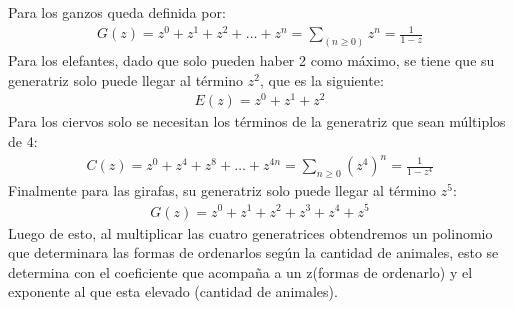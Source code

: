 \documentclass[spanish, fleqn]{article}
\begin{document}
    Para los ganzos queda definida por:
    \begin{align*}
    G(z)=z^0+z^1+z^2+\dots+z^n=\sum_(n \geqslant 0) z^n =\frac{1}{1-z}
    \end{align*}
    Para los elefantes, dado que solo pueden haber 2 como máximo, se tiene que su generatriz solo puede llegar al término $z^2$, que es la siguiente:
    \begin{align*}
    E(z)=z^0+z^1+z^2
    \end{align*}
    Para los ciervos solo se necesitan los términos de la generatriz que sean múltiplos de 4:
    \begin{align*}
    C(z)=z^0+z^4+z^8+\dots+z^{4n}=\sum_{n \geqslant 0} (z^4)^n=\frac{1}{1-z^4}
    \end{align*}
    Finalmente para las girafas, su generatriz solo puede llegar al término $z^5$:
    \begin{align*}
    G(z)=z^0+z^1+z^2+z^3+z^4+z^5
	\end{align*}    
	Luego de esto, al multiplicar las cuatro generatrices obtendremos un polinomio que determinara las formas de ordenarlos según la cantidad de animales, esto se determina con el coeficiente que acompaña a un z(formas de ordenarlo) y el exponente al que esta elevado (cantidad de animales).
	
\end{document}
